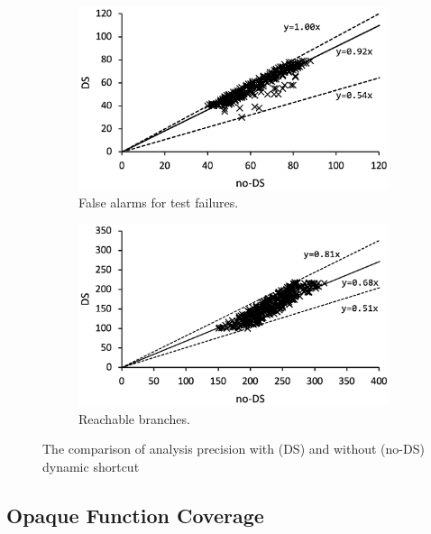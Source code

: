 \begin{figure}
  \centering
  \begin{subfigure}[t]{0.48\textwidth}
    \vspace*{-1em}
    \includegraphics[width=\linewidth]{img/precision-fail}
    \caption{False alarms for test failures.}
    \label{fig:precision-fail}
  \end{subfigure}
  \begin{subfigure}[t]{0.48\textwidth}
    \includegraphics[width=\linewidth]{img/precision-branch}
    \caption{Reachable branches.}
    \label{fig:abs-analysis-ratio}
  \end{subfigure}
  \caption{The comparison of analysis precision with (DS) and without (no-DS)
  dynamic shortcut}
  \label{fig:precision}
  \vspace*{-1.5em}
\end{figure}

\todo


\subsection{Opaque Function Coverage}

\todo
